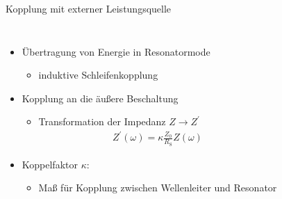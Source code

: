 \documentclass[12pt,xcolor=dvipsnames,professionalfonts]{beamer}
\begin{document}
\begin{frame}{Kopplung mit externer Leistungsquelle}
	\begin{columns}[c]
		\begin{itemize}
			\setlength\itemsep{1.25em}
			\item Übertragung von Energie in Resonatormode
			\begin{itemize}
				\setlength\itemsep{0.25em}
				\item induktive Schleifenkopplung
			\end{itemize}
			
			\item Kopplung an die äußere Beschaltung
			\begin{itemize}
				\setlength\itemsep{0.25em}
				\item Transformation der Impedanz $Z \rightarrow Z^\prime$
				\begin{align*}
					Z^\prime(\omega) = \kappa \frac{Z_0}{R_\mathrm{S}} Z(\omega)
				\end{align*}
			\end{itemize}
			
			\item Koppelfaktor $\kappa$:
			\begin{itemize}
				\setlength\itemsep{0.25em}
				\item Maß für Kopplung zwischen Wellenleiter und Resonator\setlength\itemsep{0.25em}
			\end{itemize}
		\end{itemize}
		

\end{columns}
\end{frame}
\end{document}
